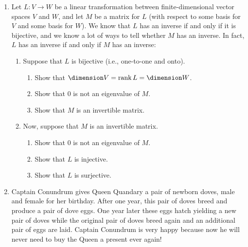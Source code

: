 \begin{enumerate}
\begin{enumerate}
\end{enumerate}

\item Let \(L \colon V \to W\) be a linear transformation between finite-dimensional vector spaces \(V\) and \(W\), and let \(M\) be a matrix for \(L\) (with respect to some basis for \(V\) and some basis for \(W\)). We know that \(L\) has an inverse if and only if it is bijective, and we know a lot of ways to tell whether \(M\) has an inverse. In fact, \(L\) has an inverse if and only if \(M\) has an inverse:
\begin{enumerate}
\item Suppose that \(L\) is bijective (i.e., one-to-one and onto).
\begin{enumerate}
\item Show that \(\dimension V=\rank L=\dimension W\).
\item Show that \(0\) is not an eigenvalue of \(M\).
\item Show that \(M\) is an invertible matrix. 
\end{enumerate}
\item Now, suppose that \(M\) is an invertible matrix.
\begin{enumerate}
\item Show that \(0\) is not an eigenvalue of \(M\).
\item Show that \(L\) is injective.
\item Show that \(L\) is surjective.
\end{enumerate}
\end{enumerate}

\item Captain Conundrum gives Queen Quandary a pair of newborn doves, male and female for her birthday. After one year, this pair of doves breed and produce a pair of dove eggs. One year later these eggs hatch yielding a new pair of doves while the original pair of doves breed again and an additional pair of eggs are laid.  Captain Conundrum is
very happy because now he will never need to buy the Queen a present ever again! 


\end{enumerate}
